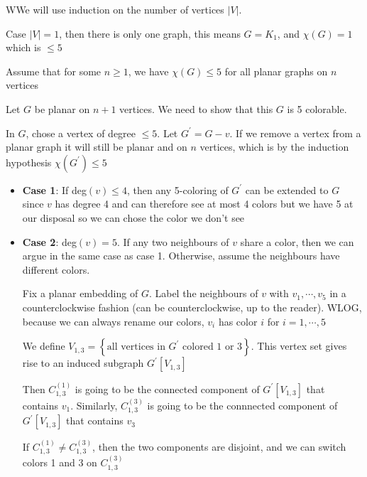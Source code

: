 \begin{prf}
  WWe will use induction on the number of vertices $\left|V\right|$.
  \par\bigskip
  \noindent Case $\left|V\right| = 1$, then there is only one graph, this means $G = K_1$, and $\chi(G) = 1$ which is $\leq 5$ 
  \par\bigskip
  \noindent Assume that for some $n\geq1$, we have $\chi(G)\leq 5$ for all planar graphs on $n$ vertices\par
  \noindent Let $G$ be planar on $n+1$ vertices. We need to show that this $G$ is 5 colorable.\par
  \noindent In $G$, chose a vertex of degree $\leq 5$. Let $G^{\prime} = G-v$. If we remove a vertex from a planar graph it will still be planar and on $n$  vertices, which is by the induction hypothesis $\chi(G^{\prime})\leq 5$
  \par\bigskip
  \begin{itemize}
    \item\textbf{Case 1}: If deg$(v)\leq4$, then any 5-coloring of $G^{\prime}$ can be extended to $G$ since $v$ has degree 4 and can therefore see at most 4 colors but we have 5 at our disposal so we can chose the color we don't see
      \par\bigskip
    \item\textbf{Case 2}: deg$(v) = 5$. If any two neighbours of $v$ share a color, then we can argue in the same case as case 1. Otherwise, assume the neighbours have different colors.\par
      \noindent Fix a planar embedding of $G$. Label the neighbours of $v$ with $v_1,\cdots,v_5$ in a counterclockwise fashion (can be counterclockwise, up to the reader). WLOG, because we can always rename our colors, $v_i$ has color $i$ for $i = 1,\cdots,5$
      \par\bigskip
      \noindent We define $V_{1,3} = \left\{\text{all vertices in $G^{\prime}$ colored 1 or 3}\right\}$. This vertex set gives rise to an induced subgraph $G^{\prime}[V_{1,3}]$
      \par\bigskip
      \noindent Then $C_{1,3}^{(1)}$ is going to be the connected component of $G^{\prime}[V_{1,3}]$  that contains $v_1$. Similarly, $C_{1,3}^{(3)}$ is going to be the connnected component of  $G^{\prime}[V_{1,3}]$  that contains $v_3$
      \par\bigskip
      \noindent If $C_{1,3}^{(1)}\neq C_{1,3}^{(3)}$, then the two components are disjoint, and we can switch colors 1 and 3 on $C_{1,3}^{(3)}$
      \par\bigskip

\end{itemize}
\end{prf}
